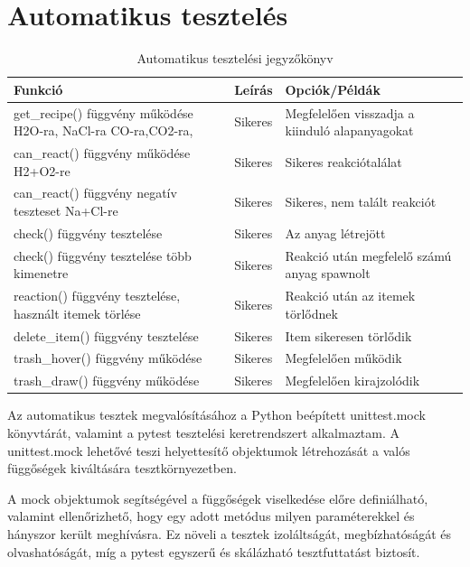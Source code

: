 \documentclass[]{thesis-ekf}
\begin{document}
	\section{Automatikus tesztelés}
	\begin{table}[ht!]
		\centering
		\footnotesize
		\begin{tabular}{|>{\centering}m{4.5cm}|>{\centering}m{3cm}|>{\centering\arraybackslash}m{7cm}|}
			\hline
			\textbf{Funkció} & \textbf{Leírás} & \textbf{Opciók/Példák} \\
			\hline
			get\_recipe() függvény működése  H2O-ra, NaCl-ra CO-ra,CO2-ra, & Sikeres & Megfelelően visszadja a kiinduló alapanyagokat \\
			\hline
			can\_react() függvény működése H2+O2-re & Sikeres & Sikeres reakciótalálat \\
			\hline
			can\_react() függvény negatív teszteset Na+Cl-re & Sikeres & Sikeres, nem talált reakciót \\
			\hline
			check() függvény tesztelése & Sikeres & Az anyag létrejött \\
			\hline
			check() függvény tesztelése több kimenetre & Sikeres & Reakció után megfelelő számú anyag spawnolt \\
			\hline
			reaction() függvény tesztelése, használt itemek törlése & Sikeres & Reakció után az itemek törlődnek \\
			\hline
			delete\_item() függvény tesztelése & Sikeres & Item sikeresen törlődik\\
			\hline
			trash\_hover() függvény működése & Sikeres & Megfelelően működik\\
			\hline
			trash\_draw() függvény működése & Sikeres & Megfelelően kirajzolódik\\
			\hline
		\end{tabular}
		\caption{Automatikus tesztelési jegyzőkönyv}
		\label{ATeszt-jegyzokonyv}
	\end{table}
	
	Az automatikus tesztek megvalósításához a Python beépített unittest.mock\cite{unittest_mock} könyvtárát, valamint a pytest\cite{pytest} tesztelési keretrendszert alkalmaztam. A unittest.mock lehetővé teszi helyettesítő objektumok létrehozását a valós függőségek kiváltására tesztkörnyezetben.
	
	A mock objektumok segítségével a függőségek viselkedése előre definiálható, valamint ellenőrizhető, hogy egy adott metódus milyen paraméterekkel és hányszor került meghívásra. Ez növeli a tesztek izoláltságát, megbízhatóságát és olvashatóságát, míg a pytest egyszerű és skálázható tesztfuttatást biztosít.
	
\end{document}
